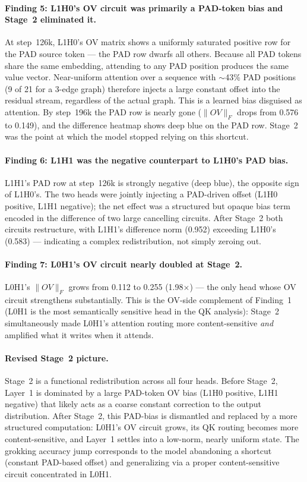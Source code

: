\documentclass[11pt, a4paper]{article}
\begin{document}
\paragraph{Finding 5: L1H0's OV circuit was primarily a PAD-token bias and
Stage~2 eliminated it.}
At step~126k, L1H0's OV matrix shows a uniformly saturated positive row for
the PAD source token --- the PAD row dwarfs all others.  Because all PAD tokens
share the same embedding, attending to any PAD position produces the same value
vector.  Near-uniform attention over a sequence with $\sim$43\% PAD positions
(9 of 21 for a 3-edge graph) therefore injects a large constant offset into the
residual stream, regardless of the actual graph.  This is a learned bias
disguised as attention.  By step~196k the PAD row is nearly gone ($\|OV\|_F$
drops from 0.576 to 0.149), and the difference heatmap shows deep blue on the
PAD row.  Stage~2 was the point at which the model stopped relying on this
shortcut.

\paragraph{Finding 6: L1H1 was the negative counterpart to L1H0's PAD bias.}
L1H1's PAD row at step~126k is strongly negative (deep blue), the opposite sign
of L1H0's.  The two heads were jointly injecting a PAD-driven offset
(L1H0 positive, L1H1 negative); the net effect was a structured but
opaque bias term encoded in the difference of two large cancelling circuits.
After Stage~2 both circuits restructure, with L1H1's difference norm (0.952)
exceeding L1H0's (0.583) --- indicating a complex redistribution, not simply
zeroing out.

\paragraph{Finding 7: L0H1's OV circuit nearly doubled at Stage~2.}
L0H1's $\|OV\|_F$ grows from 0.112 to 0.255 (1.98$\times$) --- the only head
whose OV circuit strengthens substantially.  This is the OV-side complement of
Finding~1 (L0H1 is the most semantically sensitive head in the QK analysis):
Stage~2 simultaneously made L0H1's attention routing more content-sensitive
\emph{and} amplified what it writes when it attends.

\paragraph{Revised Stage~2 picture.}
Stage~2 is a functional redistribution across all four heads.  Before Stage~2,
Layer~1 is dominated by a large PAD-token OV bias (L1H0 positive, L1H1
negative) that likely acts as a coarse constant correction to the output
distribution.  After Stage~2, this PAD-bias is dismantled and replaced by a
more structured computation: L0H1's OV circuit grows, its QK routing becomes
more content-sensitive, and Layer~1 settles into a low-norm, nearly uniform
state.  The grokking accuracy jump corresponds to the model abandoning a
shortcut (constant PAD-based offset) and generalizing via a proper
content-sensitive circuit concentrated in L0H1.
\end{document}
